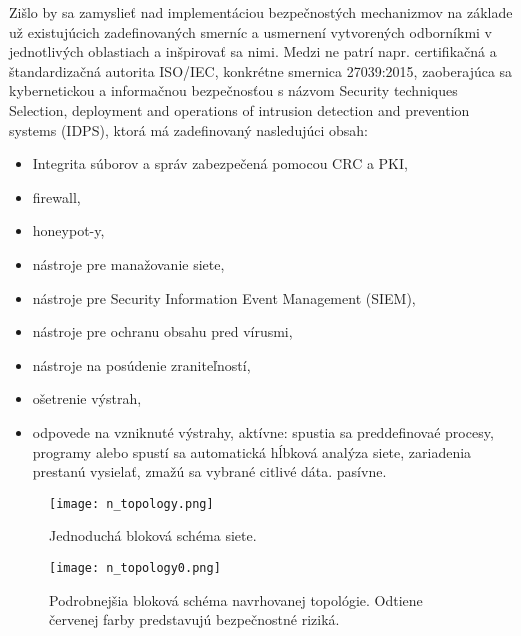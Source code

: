 \documentclass[12pt,a4wide,oneside,openright]{report}
\begin{document}
Zišlo by sa zamyslieť nad implementáciou bezpečnostých mechanizmov na základe už existujúcich zadefinovaných smerníc a usmernení vytvorených odborníkmi v jednotlivých oblastiach a inšpirovať sa nimi. Medzi ne patrí napr. certifikačná a štandardizačná autorita ISO/IEC, konkrétne smernica 27039:2015, zaoberajúca sa kybernetickou a informačnou bezpečnosťou s názvom Security techniques Selection, deployment and operations of intrusion detection and prevention systems (IDPS)\cite{iso27039}, ktorá má zadefinovaný nasledujúci obsah:
\begin{itemize}
\item Integrita súborov a správ zabezpečená pomocou CRC a PKI,
\item firewall,
\item honeypot-y,
\item nástroje pre manažovanie siete,
\item nástroje pre Security Information Event Management (SIEM),
\item nástroje pre ochranu obsahu pred vírusmi,
\item nástroje na posúdenie zraniteľností,
\item ošetrenie výstrah,
\item odpovede na vzniknuté výstrahy,
\subitem aktívne: spustia sa preddefinovaé procesy, programy alebo spustí sa automatická hĺbková analýza siete, zariadenia prestanú vysielať, zmažú sa vybrané citlivé dáta.
\subitem pasívne.
\end{itemize}
\onehalfspacing


\begin{figure*}[h]
	\centering
	\texttt{[image: n\_topology.png]}
	\caption{Jednoduchá bloková schéma siete.}
	\label{f:o_blok_topology}
\end{figure*}

\begin{figure*}[h]
	\centering
	\texttt{[image: n\_topology0.png]}
	\caption{Podrobnejšia bloková schéma navrhovanej topológie. Odtiene červenej farby predstavujú bezpečnostné riziká.}
	\label{f:o_advanced_topology}
\end{figure*}
\end{document}
